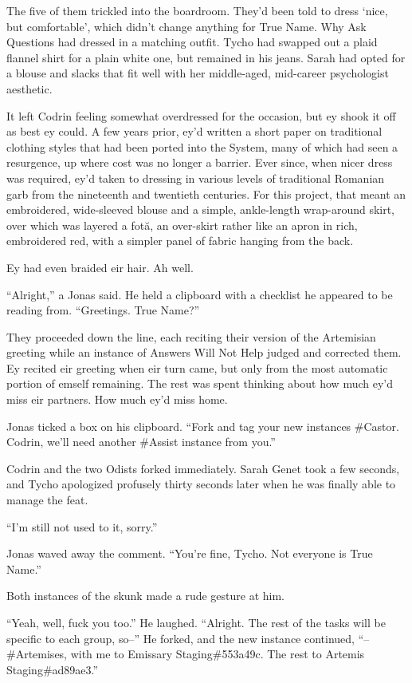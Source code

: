 The five of them trickled into the boardroom. They'd been told to dress `nice, but comfortable', which didn't change anything for True Name. Why Ask Questions had dressed in a matching outfit. Tycho had swapped out a plaid flannel shirt for a plain white one, but remained in his jeans. Sarah had opted for a blouse and slacks that fit well with her middle-aged, mid-career psychologist aesthetic.

It left Codrin feeling somewhat overdressed for the occasion, but ey shook it off as best ey could. A few years prior, ey'd written a short paper on traditional clothing styles that had been ported into the System, many of which had seen a resurgence, up where cost was no longer a barrier. Ever since, when nicer dress was required, ey'd taken to dressing in various levels of traditional Romanian garb from the nineteenth and twentieth centuries. For this project, that meant an embroidered, wide-sleeved blouse and a simple, ankle-length wrap-around skirt, over which was layered a fotă, an over-skirt rather like an apron in rich, embroidered red, with a simpler panel of fabric hanging from the back.

Ey had even braided eir hair. Ah well.

``Alright,'' a Jonas said. He held a clipboard with a checklist he appeared to be reading from. ``Greetings. True Name?''

They proceeded down the line, each reciting their version of the Artemisian greeting while an instance of Answers Will Not Help judged and corrected them. Ey recited eir greeting when eir turn came, but only from the most automatic portion of emself remaining. The rest was spent thinking about how much ey'd miss eir partners. How much ey'd miss home.

Jonas ticked a box on his clipboard. ``Fork and tag your new instances \#Castor. Codrin, we'll need another \#Assist instance from you.''

Codrin and the two Odists forked immediately. Sarah Genet took a few seconds, and Tycho apologized profusely thirty seconds later when he was finally able to manage the feat.

``I'm still not used to it, sorry.''

Jonas waved away the comment. ``You're fine, Tycho. Not everyone is True Name.''

Both instances of the skunk made a rude gesture at him.

``Yeah, well, fuck you too.'' He laughed. ``Alright. The rest of the tasks will be specific to each group, so--'' He forked, and the new instance continued, ``--\#Artemises, with me to Emissary Staging\#553a49c. The rest to Artemis Staging\#ad89ae3.''

